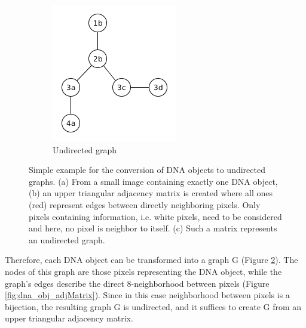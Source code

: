 \documentclass{article}
\begin{document}
\begin{figure}[!htbp]
\begin{subfigure}{0.25\textwidth}
		\includegraphics[width=\linewidth]{small_DNA_obj_graph.png}
		\caption{Undirected graph}
		\label{fig:dna_obj_graph}
	\end{subfigure}
	\caption{Simple example for the conversion of DNA objects to undirected graphs.
		(a) From a small image containing exactly one DNA object, (b) an upper triangular adjacency matrix is created where all ones (red) represent edges between directly neighboring pixels. Only pixels containing information, i.e. white pixels, need to be considered and here, no pixel is neighbor to itself. (c) Such a matrix represents an undirected graph.}
	\label{fig:dna_graph_creation}
\end{figure}
Therefore, each DNA object can be transformed into a graph G (Figure \ref{fig:dna_graph_creation}). The nodes of this graph are those pixels representing the DNA object, while the graph's edges describe the direct 8-neighborhood between pixels (Figure \ref{fig:dna_obj_adjMatrix}). Since in this case neighborhood between pixels is a bijection, the resulting graph G is undirected, and it suffices to create G from an upper triangular adjacency matrix.\\
\end{document}
